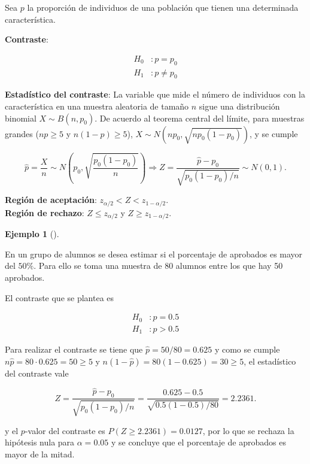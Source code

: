 \documentclass[
  spanish,
  a4paper,
]{scrreport}
\theoremstyle{plain}
\theoremstyle{definition}
\newtheorem{example}{Ejemplo}[chapter]
\theoremstyle{definition}
\theoremstyle{remark}
\begin{document}
Sea \(p\) la proporción de individuos de una población que tienen una
determinada característica.

\textbf{Contraste}:

\begin{align*}
H_0 &: p=p_0 \\
H_1 &: p\neq p_0
\end{align*}

\textbf{Estadístico del contraste}: La variable que mide el número de
individuos con la característica en una muestra aleatoria de tamaño
\(n\) sigue una distribución binomial \(X\sim B(n,p_0)\). De acuerdo al
teorema central del límite, para muestras grandes (\(np\geq 5\) y
\(n(1-p)\geq 5\)), \(X\sim N(np_0,\sqrt{np_0(1-p_0)})\), y se cumple

\[
\hat{p}=\frac{X}{n} \sim N\left(p_0,\sqrt{\frac{p_0(1-p_0)}{n}}\right) \Rightarrow Z = \frac{\hat
p-p_0}{\sqrt{p_0(1-p_0)/n}}\sim N(0,1).
\]

\textbf{Región de aceptación}: \(z_{\alpha/2}< Z < z_{1-\alpha/2}\).\\
\textbf{Región de rechazo}: \(Z\leq z_{\alpha/2}\) y
\(Z\geq z_{1-\alpha/2}\).

\begin{example}[]\protect\hypertarget{exm-contraste-proporcion}{}\label{exm-contraste-proporcion}

En un grupo de alumnos se desea estimar si el porcentaje de aprobados es
mayor del \(50\%\). Para ello se toma una muestra de 80 alumnos entre
los que hay 50 aprobados.

El contraste que se plantea es

\begin{align*}
H_0 &: p=0.5 \\
H_1 &: p>0.5
\end{align*}

Para realizar el contraste se tiene que \(\hat p= 50/80 = 0.625\) y como
se cumple \(n\hat p=80\cdot 0.625 = 50\geq 5\) y
\(n(1-\hat p)=80(1-0.625)=30\geq 5\), el estadístico del contraste vale

\[
Z = \frac{\hat p-p_0}{\sqrt{p_0(1-p_0)/n}} = \frac{0.625-0.5}{\sqrt{0.5(1-0.5)/80}} = 2.2361.
\]

y el \(p\)-valor del contraste es \(P(Z\geq 2.2361)=0.0127\), por lo que
se rechaza la hipótesis nula para \(\alpha=0.05\) y se concluye que el
porcentaje de aprobados es mayor de la mitad.

\end{example}
\end{document}
